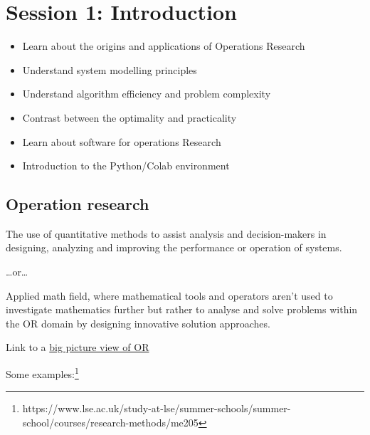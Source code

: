 \section{Session 1: Introduction}

\begin{itemize}
  \item Learn about the origins and applications of Operations Research
  \item Understand system modelling principles
  \item Understand algorithm efficiency and problem complexity
  \item Contrast between the optimality and practicality
  \item Learn about software for operations Research
  \item Introduction to the Python/Colab environment
\end{itemize}



\subsection{Operation research}

The use of quantitative methods to assist analysis and decision-makers in designing, analyzing and improving the performance or operation of systems.

\dots or\dots

Applied math field, where mathematical tools and operators aren't used to investigate mathematics further but rather to analyse and solve problems within the OR domain by designing innovative solution approaches.

Link to a \href{https://towardsdatascience.com/the-big-picture-of-operations-research-8652d5153aad}{big picture view of OR}

Some examples:\footnote{https://www.lse.ac.uk/study-at-lse/summer-schools/summer-school/courses/research-methods/me205}

